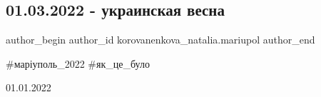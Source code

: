  
 
 
 
 

\subsection{01.03.2022 - украинская весна}
\label{sec:01_03_2023.fb.korovanenkova_natalia.mariupol.1.01_03_2022_ukr_vesna_pic}

\ifcmt
 author_begin
   author_id korovanenkova_natalia.mariupol
 author_end
\fi

\#маріуполь\_2022 \#як\_це\_було

01.01.2022

